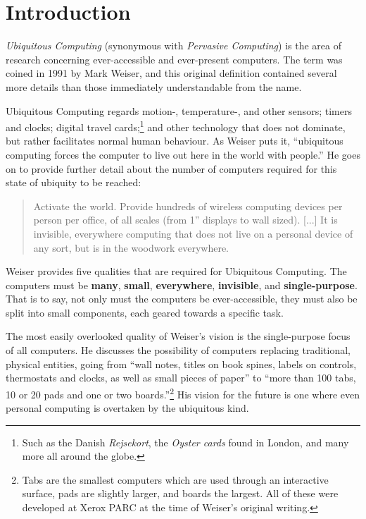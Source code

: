 \section{Introduction}

\emph{Ubiquitous Computing} (synonymous with \emph{Pervasive Computing}) is the area of research concerning
ever-accessible and ever-present computers. The term was coined in 1991 by Mark Weiser, and this original
definition contained several more details than those immediately understandable from the name.

Ubiquitous Computing regards motion-, temperature-, and other sensors; timers and clocks; digital travel
cards;\footnote{Such as the Danish \emph{Rejsekort}, the \emph{Oyster cards} found in London, and many more
all around the globe.} and other technology that does not dominate, but rather facilitates normal human
behaviour. As Weiser puts it, ``ubiquitous computing forces the computer to live out here in the world with
people.''\cite{weiseronline} He goes on to provide further detail about the number of computers required for
this state of ubiquity to be reached:

\begin{quote}
     Activate the world. Provide hundreds of wireless computing devices per person per
     office, of all scales (from 1'' displays to wall sized). [...] It is invisible, everywhere computing that does
     not live on a personal device of any sort, but is in the woodwork everywhere.\cite{weiseronline}
\end{quote}

Weiser provides five qualities that are required for Ubiquitous Computing. The computers must be
\textbf{many}, \textbf{small}, \textbf{everywhere}, \textbf{invisible}, and \textbf{single-purpose}. That is to say,
not only must the computers be ever-accessible, they must also be split into small components, each geared towards
a specific task.

The most easily overlooked quality of Weiser's vision is the single-purpose focus of all computers. He discusses
the possibility of computers replacing traditional, physical entities, going from ``wall notes, titles on book spines,
labels on controls, thermostats and clocks, as well as small pieces of paper'' to ``more than 100 tabs, 10 or 20 pads
and one or two boards.''\footnote{Tabs are the smallest computers which are used through an interactive surface, pads
are slightly larger, and boards the largest. All of these were developed at Xerox PARC at the time of Weiser's original
writing.}\cite{weiser91} His vision for the future is one where even personal computing is overtaken by the ubiquitous
kind.


